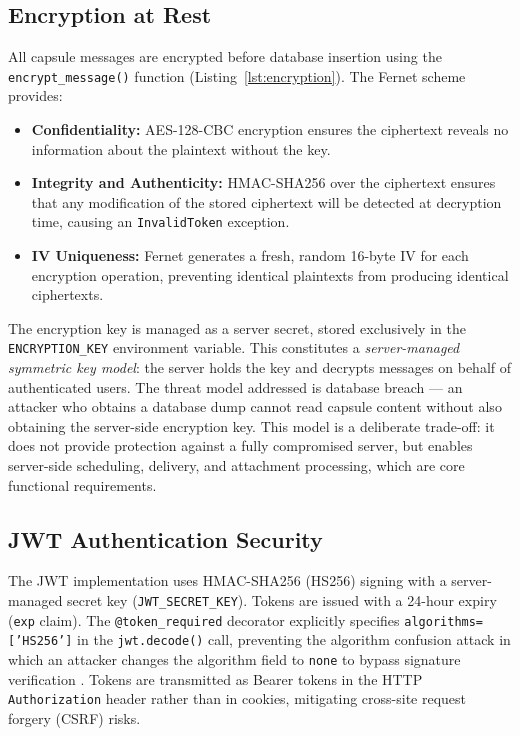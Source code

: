 \documentclass[12pt, a4paper]{article}
\begin{document}
\subsection{Encryption at Rest}

\label{subsec:encryption_security}

All capsule messages are encrypted before database insertion using the \texttt{encrypt\_message()} function (Listing~\ref{lst:encryption}). The Fernet scheme provides:

\begin{itemize}
  \item \textbf{Confidentiality:} AES-128-CBC encryption ensures the ciphertext reveals no information about the plaintext without the key.
  \item \textbf{Integrity and Authenticity:} HMAC-SHA256 over the ciphertext ensures that any modification of the stored ciphertext will be detected at decryption time, causing an \texttt{InvalidToken} exception.
  \item \textbf{IV Uniqueness:} Fernet generates a fresh, random 16-byte IV for each encryption operation, preventing identical plaintexts from producing identical ciphertexts.
\end{itemize}

The encryption key is managed as a server secret, stored exclusively in the \texttt{ENCRYPTION\_KEY} environment variable. This constitutes a \textit{server-managed symmetric key model}: the server holds the key and decrypts messages on behalf of authenticated users. The threat model addressed is database breach — an attacker who obtains a database dump cannot read capsule content without also obtaining the server-side encryption key. This model is a deliberate trade-off: it does not provide protection against a fully compromised server, but enables server-side scheduling, delivery, and attachment processing, which are core functional requirements.

\subsection{JWT Authentication Security}

The JWT implementation uses HMAC-SHA256 (HS256) signing with a server-managed secret key (\texttt{JWT\_SECRET\_KEY}). Tokens are issued with a 24-hour expiry (\texttt{exp} claim). The \texttt{@token\_required} decorator explicitly specifies \texttt{algorithms=['HS256']} in the \texttt{jwt.decode()} call, preventing the algorithm confusion attack in which an attacker changes the algorithm field to \texttt{none} to bypass signature verification \cite{fu2022}. Tokens are transmitted as Bearer tokens in the HTTP \texttt{Authorization} header rather than in cookies, mitigating cross-site request forgery (CSRF) risks.
\end{document}
